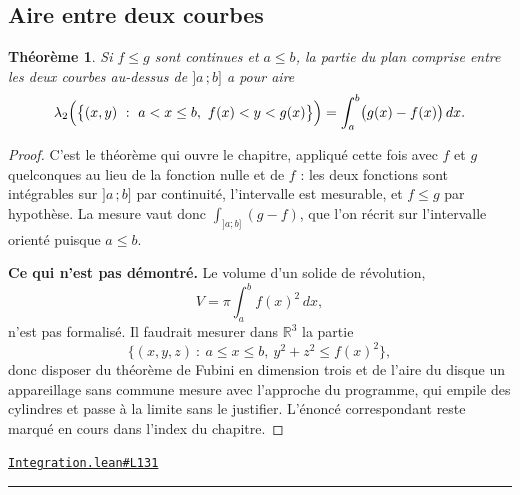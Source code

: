 \documentclass[11pt,a4paper]{article}
\theoremstyle{definition}
\theoremstyle{plain}
\newtheorem{theoreme}{Théorème}
\newcommand{\source}[2]{\par\smallskip\noindent\hfill{\footnotesize\href{#1}{\texttt{#2}}}\par\smallskip}
\begin{document}
\subsection{Aire entre deux courbes}

\begin{theoreme}
Si $f \le g$ sont continues et $a \le b$, la partie du plan comprise entre les deux
courbes au-dessus de $]a\,;b]$ a pour aire
\[ \lambda_2\Bigl(\bigl\{(x, y) \ :\ a < x \le b,\ f(x) < y < g(x)\bigr\}\Bigr)
   = \int_a^b \bigl(g(x) - f(x)\bigr)\,dx . \]
\end{theoreme}

\begin{proof}
C'est le théorème qui ouvre le chapitre, appliqué cette fois avec $f$ et $g$ quelconques
au lieu de la fonction nulle et de $f$ : les deux fonctions sont intégrables sur
$]a\,;b]$ par continuité, l'intervalle est mesurable, et $f \le g$ par hypothèse. La
mesure vaut donc $\int_{]a;b]} (g - f)$, que l'on récrit sur l'intervalle orienté puisque
$a \le b$.

\medskip\noindent
\textbf{Ce qui n'est pas démontré.} Le volume d'un solide de révolution,
\[ V = \pi \int_a^b f(x)^{2}\,dx , \]
n'est pas formalisé. Il faudrait mesurer dans $\mathbb{R}^{3}$ la partie
\[ \bigl\{(x, y, z) \ :\ a \le x \le b,\ y^{2} + z^{2} \le f(x)^{2}\bigr\} , \]
donc disposer du théorème de Fubini en dimension trois et de l'aire du disque \textemdash{}
un appareillage sans commune mesure avec l'approche du programme, qui empile des cylindres
et passe à la limite sans le justifier. L'énoncé correspondant reste marqué
\og{} en cours \fg{} dans l'index du chapitre.
\end{proof}
\source{https://github.com/Commutator-IO/learn-lean/blob/main/cours/02-lycee/06-integration/Integration.lean\#L131}{Integration.lean\#L131}

\vfill
\noindent\rule{0.35\linewidth}{0.4pt}\par
{}
\end{document}

